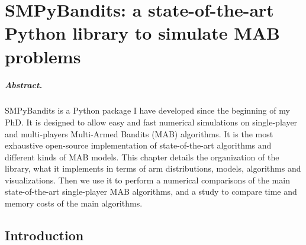 
\chapter{SMPyBandits: a state-of-the-art Python library to simulate MAB problems}
\label{chapter:3}

\graphicspath{{2-Chapters/3-Chapter/Images/}}
\graphicspath{{2-Chapters/3-Chapter/SMPyBandits_paper.git/plots/}}

\paragraph{Abstract.}
%
SMPyBandits is a Python package I have developed since the beginning of my PhD.
It is designed to allow easy and fast numerical simulations on single-player and multi-players Multi-Armed Bandits (MAB) algorithms.
It is the most exhaustive open-source implementation of state-of-the-art algorithms and different kinds of MAB models.
%
This chapter details the organization of the library, what it implements in terms of arm distributions, models, algorithms and visualizations.
Then we use it to perform a numerical comparisons of the main state-of-the-art single-player MAB algorithms, and a study to compare time and memory costs of the main algorithms.




\minitoc

\newpage


\section{Introduction}
\label{sec:3:Introduction}




